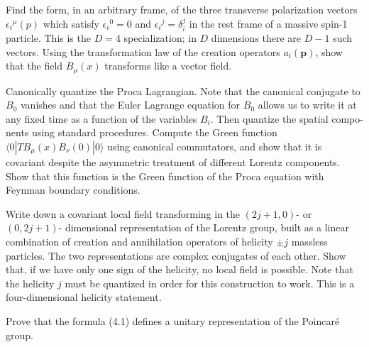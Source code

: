 \begin{banksproblems}

Find the form, in an arbitrary frame, of the three transverse polarization vectors
$\epsilon_i{}^\mu(p)$ which satisfy $\epsilon_i{}^0=0$ and
$\epsilon_i{}^j=\delta_i^j$ in the rest frame of a massive spin-1 particle.
This is the $D=4$ specialization; in $D$ dimensions there are $D-1$ such vectors.
Using the transformation law of the creation operators $a_i(\mathbf p)$, show that the field
$B_\mu(x)$ transforms like a vector field.

Canonically quantize the Proca Lagrangian. Note that the canonical conjugate to
$B_0$ vanishes and that the Euler Lagrange equation for $B_0$ allows us to write it at
any fixed time as a function of the variables $B_i$. Then quantize the spatial compo-
nents using standard procedures. Compute the Green function $\langle0|TB_\mu(x)B_\nu(0)|0\rangle$
using canonical commutators, and show that it is covariant despite the asymmetric
treatment of different Lorentz components. Show that this function is the Green
function of the Proca equation with Feynman boundary conditions.

Write down a covariant local field transforming in the $(2j+1,0)$- or $(0,2j+1)$-
dimensional representation of the Lorentz group, built as a linear combination
of creation and annihilation operators of helicity $\pm j$ massless particles. The two
representations are complex conjugates of each other. Show that, if we have only
one sign of the helicity, no local field is possible. Note that the helicity $j$ must be
quantized in order for this construction to work. This is a four-dimensional
helicity statement.

Prove that the formula (4.1) defines a unitary representation of the Poincaré group.

\end{banksproblems}
